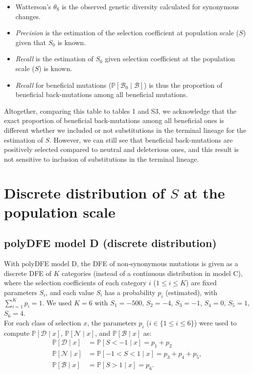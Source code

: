 \documentclass[12pt]{article}
\newcommand{\proba}{\mathbb{P}}
\newcommand{\Sphy}{S_{0}}
\newcommand{\SphyBen}{\mathcal{B}_0}
\newcommand{\Sphyclass}{x}
\newcommand{\given}{\mid}
\newcommand{\Spop}{S}
\newcommand{\SpopDel}{\mathcal{D}}
\newcommand{\SpopNeu}{\mathcal{N}}
\newcommand{\SpopBen}{\mathcal{B}}
\newcommand{\thetaSyn}{\theta_{\text{S}}}
\begin{document}
    \begin{itemize}
        \item Watterson's $\thetaSyn$ is the observed genetic diversity calculated for synonymous changes.
        \item \textit{Precision} is the estimation of the selection coefficient at population scale ($\Spop$) given that $\Sphy$ is known.
        \item  \textit{Recall} is the estimation of $\Sphy$ given selection coefficient at the population scale ($\Spop$) is known.
        \item \textit{Recall} for beneficial mutations ($\proba [\SphyBen \given \SpopBen]$) is thus the proportion of beneficial back-mutations among all beneficial mutations.
    \end{itemize}

    Altogether, comparing this table to tables 1 and S3, we acknowledge that the exact proportion of beneficial back-mutations among all beneficial ones is different whether we included or not substitutions in the terminal lineage for the estimation of $\Spop$.
    However, we can still see that beneficial back-mutations are positively selected compared to neutral and deleterious ones, and this result is not sensitive to inclusion of substitutions in the terminal lineage.

    \newpage
    \section{Discrete distribution of $\Spop$ at the population scale}

    \subsection{polyDFE model D (discrete distribution)}
    With polyDFE model D, the DFE of non-synonymous mutations is given as a discrete DFE of $K$ categories (instead of a continuous distribution in model C), where the selection coefficients of each category $i$ ($1 \leq i \leq K$) are fixed parameters $\Spop_i$, and each value $\Spop_i$ has a probability $p_i$ (estimated), with $\sum_{i=1}^{K} p_i =1$.
    We used $K=6$ with $\Spop_1 = -500$, $\Spop_2 = -4$, $\Spop_3 =-1$, $\Spop_4 = 0$, $\Spop_5 = 1$, $\Spop_6 = 4$.\\
    For each class of selection $\Sphyclass$, the parameters $p_i$ ($i \in \{ 1 \leq i \leq 6 \}$) were used to compute $\proba [ \SpopDel \given  \Sphyclass] $, $\proba [ \SpopNeu \given \Sphyclass]$, and $\proba [ \SpopBen \given \Sphyclass]$ as:
    \begin{align}
        \proba [ \SpopDel \given  \Sphyclass] &= \proba [ \Spop < -1 \given \Sphyclass ] = p_1 + p_2 \label{eq:polyProbaDel-mD} \\
        \proba [ \SpopNeu \given \Sphyclass] &= \proba [ -1 < \Spop < 1 \given \Sphyclass ] = p_3 + p_4 + p_5,  \\
        \proba [ \SpopBen \given \Sphyclass] &= \proba [  \Spop > 1 \given \Sphyclass ] = p_6.  \label{eq:polyProbaAdv-mD}
    \end{align}
\end{document}
